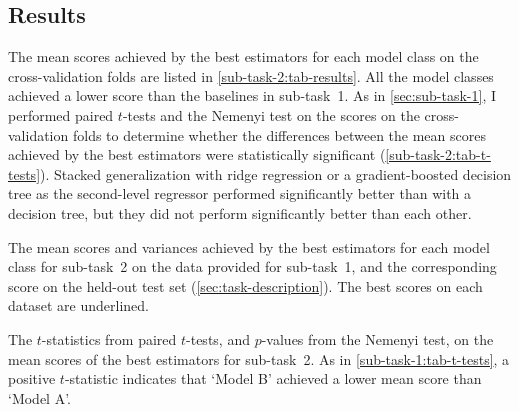 \subsection{Results}
\label{sec:sub-task-2:results}

The mean scores achieved by the best estimators for each model class on the
cross-validation folds are listed in \cref{sub-task-2:tab-results}.
All the model classes achieved a lower score than the baselines in sub-task~1.
As in \cref{sec:sub-task-1}, I performed paired $t$-tests and the Nemenyi test on the
scores on the cross-validation folds to determine whether the differences between the
mean scores achieved by the best estimators were statistically significant
(\cref{sub-task-2:tab-t-tests}).
Stacked generalization with ridge regression or a gradient-boosted decision tree as the
second-level regressor performed significantly better than with a decision tree, but
they did not perform significantly better than each other.

\begin{table}
	\centering
	
	\caption{
		The mean scores and variances achieved by the best estimators for each model class
		for sub-task~2 on the data provided for sub-task~1, and the corresponding score on
		the held-out test set (\cref{sec:task-description}).
		The best scores on each dataset are underlined.
	}
	\label{sub-task-2:tab-results}
\end{table}

\begin{table}
	\centering
	
	\caption{
		The $t$-statistics from paired $t$-tests, and $p$-values from the Nemenyi test, on
		the mean scores of the best estimators for sub-task~2.
		As in \cref{sub-task-1:tab-t-tests}, a positive $t$-statistic indicates that `Model B'
		achieved a lower mean score than `Model A'.
	}
	\label{sub-task-2:tab-t-tests}
\end{table}
